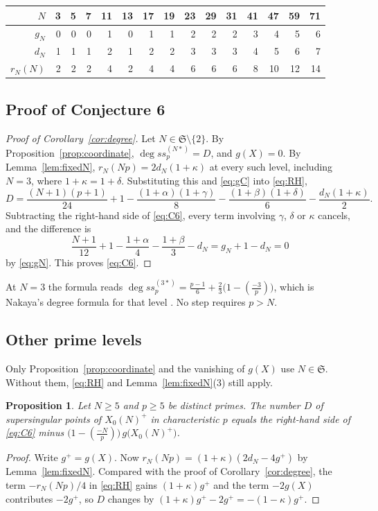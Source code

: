 \documentclass[11pt,a4paper]{article}
\newtheorem{proposition}[theorem]{Proposition}
\theoremstyle{remark}\newtheorem{remark}[theorem]{Remark}
\numberwithin{equation}{section}
\newcommand{\leg}[2]{\left(\frac{#1}{#2}\right)}
\begin{document}
	\begin{center}
		\begin{tabular}{rrrrrrrrrrrrrrr}\toprule
			$N$ & 3 & 5 & 7 & 11 & 13 & 17 & 19 & 23 & 29 & 31 & 41 & 47 & 59 & 71\\\midrule
			$g_N$ & 0 & 0 & 0 & 1 & 0 & 1 & 1 & 2 & 2 & 2 & 3 & 4 & 5 & 6\\
			$d_N$ & 1 & 1 & 1 & 2 & 1 & 2 & 2 & 3 & 3 & 3 & 4 & 5 & 6 & 7\\
			$r_N(N)$ & 2 & 2 & 2 & 4 & 2 & 4 & 4 & 6 & 6 & 6 & 8 & 10 & 12 & 14\\\bottomrule
		\end{tabular}
	\end{center}
	
	\subsection{Proof of Conjecture 6}
	\begin{proof}[Proof of Corollary~\ref{cor:degree}]
		Let $N\in\mathfrak S\setminus\{2\}$. By Proposition~\ref{prop:coordinate}, $\deg ss_p^{(N*)}=D$, and $g(X)=0$. By Lemma~\ref{lem:fixedN}, $r_N(Np)=2d_N(1+\kappa)$ at every such level, including $N=3$, where $1+\kappa=1+\delta$. Substituting this and \eqref{eq:gC} into \eqref{eq:RH},
		\[
		D=\frac{(N+1)(p+1)}{24}+1-\frac{(1+\alpha)(1+\gamma)}8-\frac{(1+\beta)(1+\delta)}6-\frac{d_N(1+\kappa)}2.
		\]
		Subtracting the right-hand side of \eqref{eq:C6}, every term involving $\gamma$, $\delta$ or $\kappa$ cancels, and the difference is
		\[
		\frac{N+1}{12}+1-\frac{1+\alpha}4-\frac{1+\beta}3-d_N=g_N+1-d_N=0
		\]
		by \eqref{eq:gN}. This proves \eqref{eq:C6}.
	\end{proof}
	
	At $N=3$ the formula reads $\deg ss_p^{(3*)}=\frac{p-1}6+\frac23\bigl(1-\leg{-3}{p}\bigr)$, which is Nakaya's degree formula for that level \cite{Nakaya}. No step requires $p>N$.
	
	\subsection{Other prime levels}
	Only Proposition~\ref{prop:coordinate} and the vanishing of $g(X)$ use $N\in\mathfrak S$. Without them, \eqref{eq:RH} and Lemma~\ref{lem:fixedN}(3) still apply.
	
	\begin{proposition}\label{prop:degree-general}
		Let $N\geq5$ and $p\geq5$ be distinct primes. The number $D$ of supersingular points of $X_0(N)^+$ in characteristic $p$ equals the right-hand side of \eqref{eq:C6} minus $\bigl(1-\leg{-N}{p}\bigr)\,g\bigl(X_0(N)^+\bigr)$.
	\end{proposition}
	\begin{proof}
		Write $g^+=g(X)$. Now $r_N(Np)=(1+\kappa)(2d_N-4g^+)$ by Lemma~\ref{lem:fixedN}. Compared with the proof of Corollary~\ref{cor:degree}, the term $-r_N(Np)/4$ in \eqref{eq:RH} gains $(1+\kappa)g^+$ and the term $-2g(X)$ contributes $-2g^+$, so $D$ changes by $(1+\kappa)g^+-2g^+=-(1-\kappa)g^+$.
	\end{proof}
	
\end{document}
